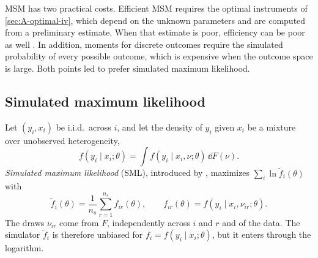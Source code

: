 MSM has two practical costs. Efficient MSM requires the optimal instruments of \cref{sec:A-optimal-iv}, which depend on
the unknown parameters and are computed from a preliminary estimate. When that estimate is poor, efficiency can be
poor as well \citep[pp.~43--44]{GourierouxMonfort1996}. In addition, moments for discrete outcomes require the
simulated probability of every possible outcome, which is expensive when the outcome space is large. Both points
led \citet[p.~732]{Gentzkow2007} to prefer simulated maximum likelihood.

\subsection{Simulated maximum likelihood}\label{sec:A-sml}

Let $(y_i, x_i)$ be i.i.d.\ across $i$, and let the density of $y_i$ given $x_i$ be a mixture over unobserved
heterogeneity,
\begin{equation*}
  f(y_i \mid x_i;\theta) = \int f(y_i \mid x_i, \nu;\theta)\,\dd F(\nu).
\end{equation*}
\emph{Simulated maximum likelihood} (SML), introduced by \citet{LermanManski1981}, maximizes
$\sum_i\ln\tilde f_i(\theta)$ with
\begin{equation}\label{eq:A-sml}
  \tilde f_i(\theta) = \frac{1}{n_s}\sum_{r=1}^{n_s} f_{ir}(\theta), \qquad
  f_{ir}(\theta) = f(y_i \mid x_i, \nu_{ir};\theta).
\end{equation}
The draws $\nu_{ir}$ come from $F$, independently across $i$ and $r$ and of the data. The simulator $\tilde f_i$ is
therefore unbiased for $f_i = f(y_i \mid x_i;\theta)$, but it enters through the logarithm.

